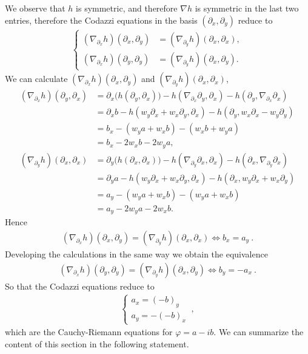 \documentclass[a4paper,11pt,openright,twoside]{book}
\renewcommand{\iff}{\Leftrightarrow}
\newcommand{\1}{\mathds{1}}
\theoremstyle{plain}
\theoremstyle{definition}
\theoremstyle{remark}
\begin{document}
We observe that $h$ is symmetric, and therefore $\nabla h$ is symmetric in the last two entries, therefore the Codazzi equations in the basis $(\partial_x,\partial_y)$ reduce to
\begin{align*}
	\begin{cases}
		(\nabla_{\partial_x}h)(\partial_x,\partial_y)
		&=(\nabla_{\partial_y}h)(\partial_x,\partial_x),\\
		(\nabla_{\partial_x}h)(\partial_y,\partial_y)
		&=(\nabla_{\partial_y}h)(\partial_x,\partial_y).
	\end{cases}
\end{align*}
We can calculate $(\nabla_{\partial_x}h)(\partial_x,\partial_y)$ and $(\nabla_{\partial_y}h)(\partial_x,\partial_x)$,
\begin{align*}
(\nabla_{\partial_x}h)(\partial_y,\partial_x)
&=\partial_x\bigl(h(\partial_y,\partial_x)\bigr)
-h(\nabla_{\partial_x}\partial_y,\partial_x)
-h(\partial_y,\nabla_{\partial_x}\partial_x)\\
&=\partial_x b
-h(w_y\partial_x+w_x\partial_y,\partial_x)
-h(\partial_y,w_x\partial_x-w_y\partial_y)\\
&=b_x-(w_ya+w_xb)-(w_xb+w_ya)\\
&=b_x-2w_xb-2w_ya,\ \\
(\nabla_{\partial_y}h)(\partial_x,\partial_x)
&=\partial_y\bigl(h(\partial_x,\partial_x)\bigr)
-h(\nabla_{\partial_y}\partial_x,\partial_x)
-h(\partial_x,\nabla_{\partial_y}\partial_x)\\
&=\partial_y a
-h(w_y\partial_x+w_x\partial_y,\partial_x)
-h(\partial_x,w_y\partial_x+w_x\partial_y)\\
&=a_y-(w_ya+w_xb)-(w_ya+w_xb)\\
&=a_y-2w_ya-2w_xb.
\end{align*}
Hence
\begin{align*}
	(\nabla_{\partial_x}h)(\partial_x,\partial_y)=(\nabla_{\partial_y}h)(\partial_x,\partial_x) \iff b_x = a_y
\ . 
\end{align*}
Developing the calculations in the same way we obtain the equivalence
\begin{align*}
	(\nabla_{\partial_x}h)(\partial_y,\partial_y)=(\nabla_{\partial_y}h)(\partial_x,\partial_y) \iff b_y = -a_x\ .
\end{align*}
So that the Codazzi equations reduce to
\begin{align*}
	\begin{cases}
		a_x = (-b)_y\\
		a_y = -(-b)_x 
	\end{cases}
\ , 
\end{align*}
which are the Cauchy-Riemann equations for $\varphi = a-ib$. We can summarize the content of this section in the following statement.
\end{document}
